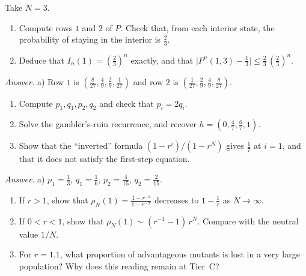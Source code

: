 \begin{exercise}
Take $N=3$.
\begin{enumerate}[label=\alph*),itemsep=0pt]
\item Compute rows $1$ and $2$ of $P$. Check that, from each interior state, the probability of staying
in the interior is $\frac23$.
\item Deduce that $I_n(1)=(\frac23)^n$ exactly, and that $\bigl|P^n(1,3)-\frac13\bigr|\le\frac23\,(\frac23)^n$.
\end{enumerate}
\emph{Answer.} a) Row $1$ is $(\frac8{27},\frac49,\frac29,\frac1{27})$ and row $2$ is
$(\frac1{27},\frac29,\frac49,\frac8{27})$.
\end{exercise}

\begin{exercise}[Moran, $N=3$, $r=2$]\label{ch4:ex:moran3}
\begin{enumerate}[label=\alph*),itemsep=0pt]
\item Compute $p_1,q_1,p_2,q_2$ and check that $p_i=2q_i$.
\item Solve the gambler's-ruin recurrence, and recover $h=(0,\frac47,\frac67,1)$.
\item Show that the ``inverted'' formula $(1-r^i)/(1-r^N)$ gives $\frac17$ at $i=1$, and that it does not satisfy
the first-step equation.
\end{enumerate}
\emph{Answer.} a) $p_1=\frac13$, $q_1=\frac16$, $p_2=\frac4{15}$, $q_2=\frac2{15}$.
\end{exercise}

\begin{exercise}
\begin{enumerate}[label=\alph*),itemsep=0pt]
\item If $r>1$, show that $\rho_N(1)=\frac{1-r^{-1}}{1-r^{-N}}$ decreases to $1-\frac1r$ as $N\to\infty$.
\item If $0<r<1$, show that $\rho_N(1)\sim(r^{-1}-1)\,r^N$. Compare with the neutral value $1/N$.
\item For $r=1.1$, what proportion of advantageous mutants is lost in a very large population? Why
does this reading remain at Tier~C?
\end{enumerate}
\end{exercise}


